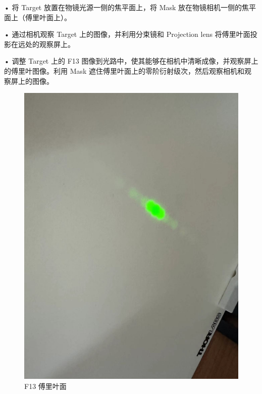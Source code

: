 \documentclass{ctexart}
\begin{document}
• 将 Target 放置在物镜光源一侧的焦平面上，将 Mask 放在物镜相机一侧的焦平面上（傅里叶面上）。

• 通过相机观察 Target 上的图像，并利用分束镜和 Projection lens 将傅里叶面投影在远处的观察屏上。

• 调整 Target 上的 F13 图像到光路中，使其能够在相机中清晰成像，并观察屏上的傅里叶图像。利用 Mask 遮住傅里叶面上的零阶衍射级次，然后观察相机和观察屏上的图像。
\begin{figure}[H]
  \centering
  \begin{minipage}[b]{0.2\textwidth}
    \centering
    \includegraphics[width=\textwidth]{pictures/微信图片_20241010201057.jpg}
    \caption{F13 傅里叶面}
  \end{minipage}
  \hspace{0.05\textwidth} %
  \begin{minipage}[b]{0.2\textwidth}
    \centering

\end{minipage}
\end{figure}
\end{document}
